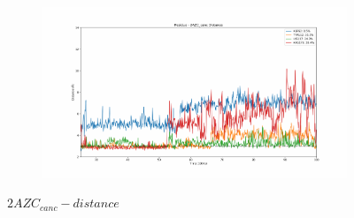 \documentclass[fleqn,10pt]{wlscirep}
\begin{document}
\begin{figure}[!ht]
\begin{subfigure}{.45\textwidth}
  \end{subfigure}
    \begin{subfigure}{.45\textwidth}
     \centering
     \includegraphics[width=.95\linewidth]{2AZC_canc/2AZC_canc-dist_4.pdf}
  \end{subfigure}
\caption{$2AZC_{canc}-distance$}
\label{sup:2AZC_canc-dist}
\end{figure}
\end{document}

